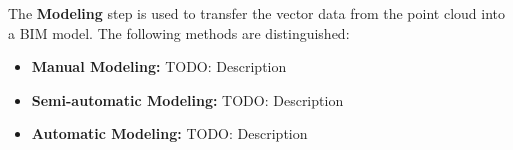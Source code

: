 \begin{English}
    The \textbf{Modeling} step is used to transfer the vector data from the point cloud into a BIM model. The following methods are distinguished:

    \begin{itemize}
        \item \textbf{Manual Modeling:} TODO: Description
        \item \textbf{Semi-automatic Modeling:} TODO: Description
        \item \textbf{Automatic Modeling:} TODO: Description
    \end{itemize}
\end{English}